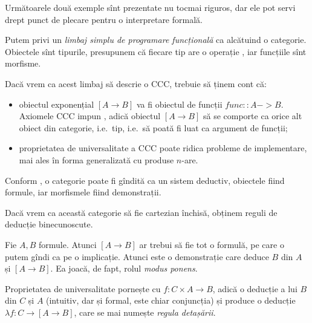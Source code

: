 \vspace{1cm}

Următoarele două exemple sînt prezentate nu tocmai riguros, dar ele pot servi drept
punct de plecare pentru o interpretare formală.

Putem privi un \emph{limbaj simplu de programare funcțională} ca alcătuind o categorie.
Obiectele sînt tipurile, presupunem că fiecare tip are o operație , iar
funcțiile sînt morfisme.

Dacă vrem ca acest limbaj să descrie o CCC, trebuie să ținem cont că:
\begin{itemize}
\item obiectul exponențial $ [A \to B] $ va fi obiectul de funcții $ func :: A -> B $.
  Axiomele CCC impun , adică obiectul $ [A \to B] $ să se comporte
  ca orice alt obiect din categorie, i.e.\ tip, i.e.\ să poată fi luat ca argument
  de funcții;
\item proprietatea de universalitate a CCC poate ridica probleme de implementare, mai
  ales în forma generalizată cu produse $ n $-are.
\end{itemize}

\vspace{1cm}

Conform \cite{lambek}, o categorie poate fi gîndită ca un sistem deductiv,
obiectele fiind formule, iar morfismele fiind demonstrații.

Dacă vrem ca această categorie să fie cartezian închisă, obținem reguli de
deducție binecunoscute.

Fie $ A, B $ formule. Atunci $ [A \to B] $ ar trebui să fie tot o formulă,
pe care o putem gîndi ca pe o implicație. Atunci  este o
demonstrație care deduce $ B $ din $ A $ și $ [A \to B] $. Ea joacă,
de fapt, rolul \emph{modus ponens}.

Proprietatea de universalitate pornește cu $ f : C \times A \to B $, adică
o deducție a lui $ B $ din $ C $ și $ A $ (intuitiv, dar și formal, este chiar
conjuncția) și produce o deducție $ \lambda f : C \to [A \to B] $, care se mai
numește \emph{regula detașării}.



